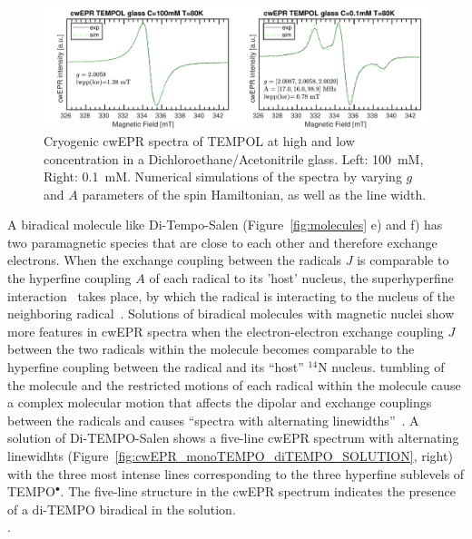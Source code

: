 \begin{figure}[h]
\center
	\includegraphics[width=1\textwidth]{./operando_epr/figures/TEMPOL/cwEPR_TEMPOL_100mM_vs_p1mM_80K.pdf}
	\caption{Cryogenic cwEPR spectra of TEMPOL at high and low concentration in a Dichloroethane/Acetonitrile glass. Left: 100~mM, Right: 0.1~mM. Numerical simulations of the spectra by varying $g$ and $A$ parameters of the spin Hamiltonian, as well as the line width.}
	\label{fig:cwEPR_TEMPOL_High_Low_Concentrations}
\end{figure}



\par
A biradical molecule like Di-Tempo-Salen (Figure~\ref{fig:molecules} e) and f) has two paramagnetic species that are close to each other and therefore exchange electrons. When the exchange coupling between the radicals $J$ is comparable to the hyperfine coupling $A$ of each radical to its 'host' nucleus, the superhyperfine interaction~\cite{Carrington_solution_epr} takes place, by which the radical is interacting to the nucleus of the neighboring radical~\cite{Eaton2018}. Solutions of biradical molecules with magnetic nuclei show more features in cwEPR spectra when the electron-electron exchange coupling $J$ between the two radicals within the molecule becomes comparable to the hyperfine coupling between the radical and its ``host'' $^{14}$N nucleus. tumbling of the molecule and the restricted motions of each radical within the molecule cause a complex molecular motion that affects the dipolar and exchange couplings between the radicals and causes ``spectra with alternating linewidths''~\cite{Eaton2018,Carrington_g_factor}. A solution of Di-TEMPO-Salen shows a five-line cwEPR spectrum with alternating linewidhts (Figure~\ref{fig:cwEPR_monoTEMPO_diTEMPO_SOLUTION}, right) with the three most intense lines corresponding to the three hyperfine sublevels of TEMPO$^{\bullet}$. The five-line structure in the cwEPR spectrum indicates the presence of a di-TEMPO biradical in the solution.\\
\newpage
.
\newpage
